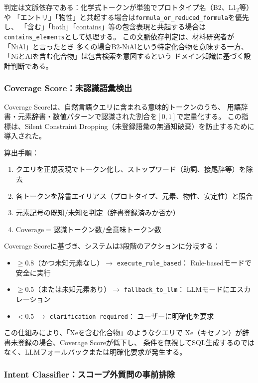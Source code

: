 \documentclass[5p,twocolumn]{elsarticle}
\begin{document}
判定は文脈依存である：化学式トークンが単独でプロトタイプ名（B2、L1$_2$等）や
「エントリ」「物性」と共起する場合は\texttt{formula\_or\_reduced\_formula}を優先し、
「含む」「both」「contains」等の包含表現と共起する場合は
\texttt{contains\_elements}として処理する。
この文脈依存判定は、材料研究者が「NiAl」と言ったとき
多くの場合B2-NiAlという特定化合物を意味する一方、
「NiとAlを含む化合物」は包含検索を意図するという
ドメイン知識に基づく設計判断である。

\subsubsection{Coverage Score：未認識語彙検出}
\label{sec:coverage_score}

Coverage Scoreは、自然言語クエリに含まれる意味的トークンのうち、
用語辞書・元素辞書・数値パターンで認識された割合を$[0, 1]$で定量化する。
この指標は、Silent Constraint Dropping（未登録語彙の無通知破棄）を防止するために導入された。

算出手順：
\begin{enumerate}
  \item クエリを正規表現でトークン化し、ストップワード（助詞、接尾辞等）を除去
  \item 各トークンを辞書エイリアス（プロトタイプ、元素、物性、安定性）と照合
  \item 元素記号の既知/未知を判定（辞書登録済みか否か）
  \item $\text{Coverage} = \text{認識トークン数} / \text{全意味トークン数}$
\end{enumerate}

Coverage Scoreに基づき、システムは3段階のアクションに分岐する：

\begin{itemize}
  \item $\geq 0.8$（かつ未知元素なし）$\to$ \texttt{execute\_rule\_based}：
    Rule-basedモードで安全に実行
  \item $\geq 0.5$（または未知元素あり）$\to$ \texttt{fallback\_to\_llm}：
    LLMモードにエスカレーション
  \item $< 0.5$ $\to$ \texttt{clarification\_required}：
    ユーザーに明確化を要求
\end{itemize}

この仕組みにより、「Xeを含む化合物」のようなクエリで
Xe（キセノン）が辞書未登録の場合、Coverage Scoreが低下し、
条件を無視してSQL生成するのではなく、LLMフォールバックまたは明確化要求が発生する。

\subsubsection{Intent Classifier：スコープ外質問の事前排除}
\label{sec:intent_classifier}
\end{document}
